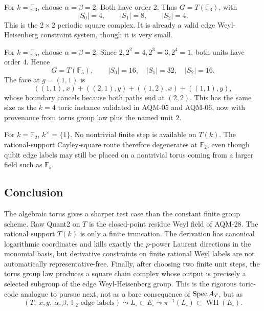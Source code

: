 For \(k=\mathbb F_3\), choose \(\alpha=\beta=2\).  Both have order \(2\).
Thus \(G=T(\mathbb F_3)\), with
\[
  |S_0|=4,\qquad |S_1|=8,\qquad |S_2|=4.
\]
This is the \(2\times2\) periodic square complex.  It is already a valid edge
Weyl-Heisenberg constraint system, though it is very small.

For \(k=\mathbb F_5\), choose \(\alpha=\beta=2\).  Since
\(2,2^2=4,2^3=3,2^4=1\), both units have order \(4\).  Hence
\[
  G=T(\mathbb F_5),\qquad |S_0|=16,\quad |S_1|=32,\quad |S_2|=16.
\]
The face at \(g=(1,1)\) is
\[
  ((1,1),x)+((2,1),y)+((1,2),x)+((1,1),y),
\]
whose boundary cancels because both paths end at \((2,2)\).  This has the
same size as the \(k=4\) toric instance validated in AQM-05 and AQM-06, now
with provenance from torus group law plus the named unit \(2\).

For \(k=\mathbb F_2\), \(k^\times=\{1\}\).  No nontrivial finite step is
available on \(T(k)\).  The rational-support Cayley-square route therefore
degenerates at \(\mathbb F_2\), even though qubit edge labels may still be
placed on a nontrivial torus coming from a larger field such as \(\mathbb F_5\).

\subsection{Conclusion}

The algebraic torus gives a sharper test case than the constant finite group
scheme.  Raw Quant2 on \(T\) is the closed-point residue Weyl field of
AQM-28.  The rational support \(T(k)\) is only a finite truncation.  The
derivation has canonical logarithmic coordinates and kills exactly the
\(p\)-power Laurent directions in the monomial basis, but derivative
constraints on finite rational Weyl labels are not automatically
representative-free.  Finally, after choosing two finite unit steps, the torus
group law produces a square chain complex whose output is precisely a selected
subgroup of the edge Weyl-Heisenberg group.  This is the rigorous toric-code
analogue to pursue next, not as a bare consequence of \(\operatorname{Spec} A_T\), but as
\[
  (T,\ x,y,\ \alpha,\beta,\ \mathbb F_2\text{-edge labels})
  \leadsto L_\square\subset E_\square
  \leadsto \pi^{-1}(L_\square)\subset\operatorname{WH}(E_\square).
\]
